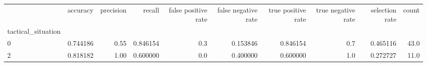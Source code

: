 \begin{tabular}{lrrrrrrrrr}
\toprule
{} &  accuracy &  precision &    recall &  false positive rate &  false negative rate &  true positive rate &  true negative rate &  selection rate &  count \\
tactical\_situation &           &            &           &                      &                      &                     &                     &                 &        \\
\midrule
0                  &  0.744186 &       0.55 &  0.846154 &                  0.3 &             0.153846 &            0.846154 &                 0.7 &        0.465116 &   43.0 \\
2                  &  0.818182 &       1.00 &  0.600000 &                  0.0 &             0.400000 &            0.600000 &                 1.0 &        0.272727 &   11.0 \\
\bottomrule
\end{tabular}
